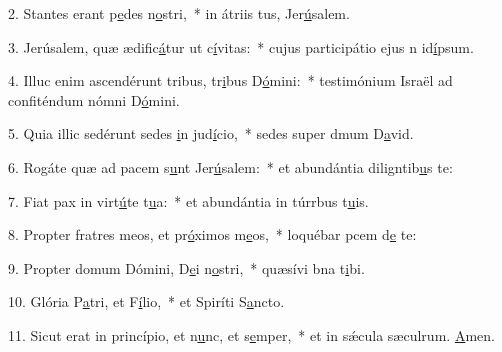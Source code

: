 2. Stantes erant p\uline{e}des n\uline{o}stri,~* in átriis tus, Jer\uline{ú}salem.\par 
3. Jerúsalem, quæ ædific\uline{á}tur ut c\uline{í}vitas:~* cujus participátio ejus n id\uline{í}psum.\par 
4. Illuc enim ascendérunt tribus, tr\uline{i}bus D\uline{ó}mini:~* testimónium Israël ad confiténdum nómni D\uline{ó}mini.\par 
5. Quia illic sedérunt sedes \uline{i}n jud\uline{í}cio,~* sedes super dmum D\uline{a}vid.\par 
6. Rogáte quæ ad pacem s\uline{u}nt Jer\uline{ú}salem:~* et abundántia diligntib\uline{u}s te:\par 
7. Fiat pax in virt\uline{ú}te t\uline{u}a:~* et abundántia in túrrbus t\uline{u}is.\par 
8. Propter fratres meos, et pr\uline{ó}ximos m\uline{e}os,~* loquébar pcem d\uline{e} te:\par 
9. Propter domum Dómini, D\uline{e}i n\uline{o}stri,~* quæsívi bna t\uline{i}bi.\par 
10. Glória P\uline{a}tri, et F\uline{í}lio,~* et Spiríti S\uline{a}ncto.\par 
11. Sicut erat in princípio, et n\uline{u}nc, et s\uline{e}mper,~* et in sǽcula sæculrum. \uline{A}men.\par 
